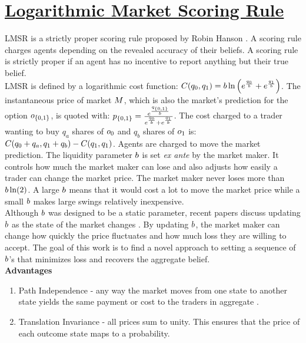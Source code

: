 \section{\href{http://mason.gmu.edu/~rhanson/mktscore.pdf}{Logarithmic Market Scoring Rule}}
LMSR is a strictly proper scoring rule proposed by Robin Hanson \cite{Hanson2003}. A scoring rule charges agents depending on the revealed accuracy of their beliefs. A scoring rule is strictly proper if an agent has no incentive to report anything but their true belief. \\ 

LMSR is defined by a logarithmic cost function: 
$C({q_0},{q_1}) = b\ln\left(e^{\frac{{q_0}}{b}} + e^{\frac{{q_1}}{b}}\right)$. The instantaneous price of market $M$, which is also the market's prediction for the option $o_{\{0,1\}}$, is quoted with: $p_{\{0,1\}} = \frac{e^{\frac{q_{\{0,1\}}}{b}}}{e^{\frac{{q_0}}{b}} + e^{\frac{{q_1}}{b}}}$. The cost charged to a trader wanting to buy $q_a$ shares of $o_0$ and $q_b$ shares of $o_1$ is: $C({q_0} + q_a, {q_1} + q_b) - C(q_1,{q_1})$. Agents are charged to move the market prediction. The liquidity parameter $b$ is set \emph{ex ante} by the market maker. It controls how much the market maker can lose and also adjusts how easily a trader can change the market price. The market maker never loses more than $b\ln(2)$. A large $b$ means that it would cost a lot to move the market price while a small $b$ makes large swings relatively inexpensive.\\

Although $b$ was designed to be a static parameter, recent papers discuss updating $b$ as the state of the market changes \cite{Othman:2013:PLA:2509413.2509414}. By updating $b$, the market maker can change how quickly the price fluctuates and how much loss they are willing to accept. The goal of this work is to find a novel approach to setting a sequence of $b$'s that minimizes loss and recovers the aggregate belief.\\

\textbf{Advantages}\\
\begin{enumerate}
\item{Path Independence - any way the market moves from one state to another state yields the same payment or cost to the traders in aggregate \cite{Hanson2003}.}
\item{Translation Invariance - all prices sum to unity. This ensures that the price of each outcome state maps to a probability.}
\end{enumerate}


